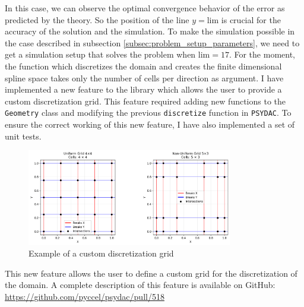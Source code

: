 \documentclass[a4paper,12pt,twoside]{report}
\begin{document}
In this case, we can observe the optimal convergence behavior of the error as predicted by the theory. So the position of the line $y = \text{lim}$ is crucial for the accuracy of the solution and the simulation.
To make the simulation possible in the case described in subsection \ref{subsec:problem_setup_parameters}, we need to get a simulation setup that solves the problem when $\text{lim} = 17$.
For the moment, the function which discretizes the domain and creates the finite dimensional spline space takes only the number of cells per direction as argument. I have implemented a new feature to the library which allows the user to provide a custom discretization grid. This feature required adding new functions to the \texttt{Geometry} class and modifying the previous \texttt{discretize} function in \texttt{PSYDAC}. To ensure the correct working of this new feature, I have also implemented a set of unit tests.
\begin{figure}[!h]
	\centering
	\includegraphics[width=0.8\textwidth]{figures/custom_grid.png}
	\caption{Example of a custom discretization grid}
	\label{fig:custom_grid_example}
\end{figure}
This new feature allows the user to define a custom grid for the discretization of the domain. A complete description of this feature is available on GitHub: \href{https://github.com/pyccel/psydac/pull/518}{https://github.com/pyccel/psydac/pull/518}
\end{document}
